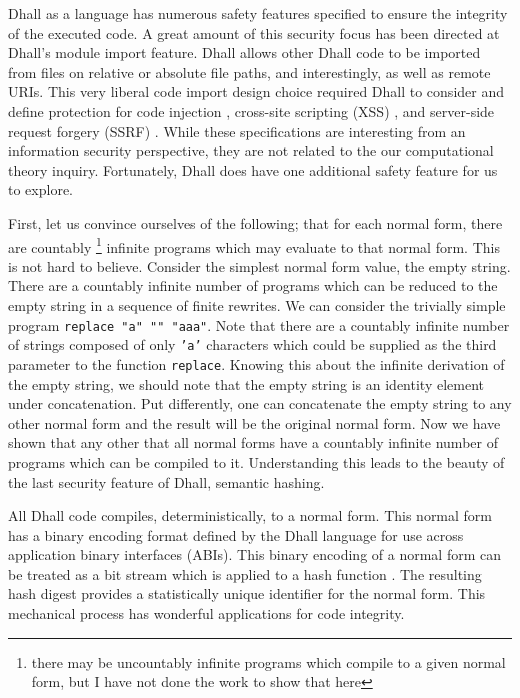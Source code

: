 \documentclass[12pt]{diazessay}
\begin{document}
Dhall as a language has numerous safety features specified to ensure the integrity of the executed code.
A great amount of this security focus has been directed at Dhall's module import feature.
Dhall allows other Dhall code to be imported from files on relative or absolute file paths, and interestingly, as well as remote URIs.
This very liberal code import design choice required Dhall to consider and define protection for code injection \cite{ray2012defining}, cross-site scripting (XSS) \cite{klein2005dom}, and server-side request forgery (SSRF) \cite{huang2003web}.
While these specifications are interesting from an information security perspective, they are not related to the our computational theory inquiry.
Fortunately, Dhall does have one additional safety feature for us to explore.

First, let us convince ourselves of the following; that for each normal form, there are countably \footnote{there may be uncountably infinite programs which compile to a given normal form, but I have not done the work to show that here} infinite programs which may evaluate to that normal form.
This is not hard to believe.
Consider the simplest normal form value, the empty string.
There are a countably infinite number of programs which can be reduced to the empty string in a sequence of finite rewrites.
We can consider the trivially simple program \texttt{replace "a" "" "aaa"}.
Note that there are a countably infinite number of strings composed of only \texttt{'a'} characters which could be supplied as the third parameter to the function \texttt{replace}.
Knowing this about the infinite derivation of the empty string, we should note that the empty string is an identity element under concatenation.
Put differently, one can concatenate the empty string to any other normal form and the result will be the original normal form.
Now we have shown that any other that all normal forms have a countably infinite number of programs which can be compiled to it.
Understanding this leads to the beauty of the last security feature of Dhall, semantic hashing.

All Dhall code compiles, deterministically, to a normal form.
This normal form has a binary encoding format defined by the Dhall language for use across application binary interfaces (ABIs).
This binary encoding of a normal form can be treated as a bit stream which is applied to a hash function \cite{knuth1973sorting}.
The resulting hash digest provides a statistically unique identifier for the normal form.
This mechanical process has wonderful applications for code integrity.
\end{document}
